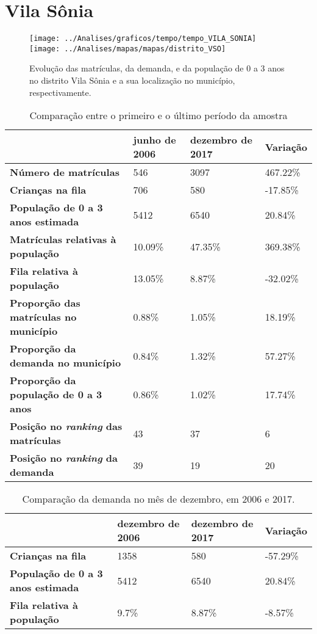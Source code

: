 \section{Vila Sônia}
\begin{figure}[H]
\centering
\texttt{[image: ../Analises/graficos/tempo/tempo\_VILA\_SONIA]}
\texttt{[image: ../Analises/mapas/mapas/distrito\_VSO]}
\caption{Evolução das matrículas, da demanda, e da população de 0 a 3 anos no distrito Vila Sônia e a sua localização no município, respectivamente.}
\end{figure}
\begin{table}[H]
\begin{tabular}{l|l|l|l}
\textbf{}                                      & \textbf{junho de 2006}       & \textbf{dezembro de 2017}    & \textbf{Variação} \\ \hline
\textbf{Número de matrículas}                  & 546 & 3097 & 467.22\% \\ \hline
\textbf{Crianças na fila}                      & 706 & 580 & -17.85\% \\ \hline
\textbf{População de 0 a 3 anos estimada}      & 5412 & 6540 & 20.84\% \\ \hline
\textbf{Matrículas relativas à população}      & 10.09\% & 47.35\% & 369.38\% \\ \hline
\textbf{Fila relativa à população}             & 13.05\% & 8.87\% & -32.02\% \\ \hline
\textbf{Proporção das matrículas no município} & 0.88\% & 1.05\% & 18.19\% \\ \hline
\textbf{Proporção da demanda no município}     & 0.84\% & 1.32\% & 57.27\% \\ \hline
\textbf{Proporção da população de 0 a 3 anos}  & 0.86\% & 1.02\% & 17.74\% \\ \hline
\textbf{Posição no \textit{ranking} das matrículas}     & 43 & 37 & 6 \\ \hline
\textbf{Posição no \textit{ranking} da demanda}         & 39 & 19 & 20 \\ 
\end{tabular}
\caption{Comparação entre o primeiro e o último período da amostra}
\end{table}
\begin{table}[H]
\begin{tabular}{l|l|l|l}
\textbf{}                                 & \textbf{dezembro de 2006} & \textbf{dezembro de 2017} & \textbf{Variação} \\ \hline
\textbf{Crianças na fila}                      & 1358 & 580 & -57.29\% \\ \hline
\textbf{População de 0 a 3 anos estimada}      & 5412 & 6540 & 20.84\% \\ \hline
\textbf{Fila relativa à população}             & 9.7\% & 8.87\% & -8.57\% \\
\end{tabular}
\caption{Comparação da demanda no mês de dezembro, em 2006 e 2017.}
\end{table}